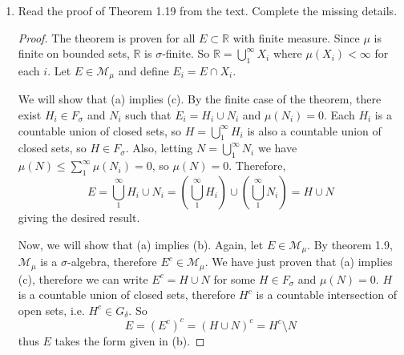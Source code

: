 \documentclass[10pt]{article}
\newcommand{\R}{\mathbb{R}}
\newcommand{\M}{\mathcal{M}}
\begin{document}
\begin{enumerate}
\begin{proof}
\end{proof}

\item Read the proof of Theorem 1.19 from the text. Complete the missing details.

\begin{proof}
The theorem is proven for all $E \subset \R$ with finite measure.  Since $\mu$ is finite on bounded sets, $\R$ is $\sigma$-finite.  So $\R = \bigcup_1^\infty X_i$ where $\mu(X_i) < \infty$ for each $i$.  Let $E \in \M_\mu$ and define $E_i = E \cap X_i$.

We will show that (a) implies (c).  By the finite case of the theorem, there exist $H_i \in F_\sigma$ and $N_i$ such that $E_i = H_i \cup N_i$ and $\mu(N_i) = 0$.  Each $H_i$ is a countable union of closed sets, so $H = \bigcup_1^\infty H_i$ is also a countable union of closed sets, so $H \in F_\sigma$.  Also, letting $N = \bigcup_1^\infty N_i$ we have $\mu(N) \leq \sum_1^\infty \mu(N_i) = 0$, so $\mu(N) = 0$.  Therefore,
$$
E = \bigcup_1^\infty H_i \cup N_i = \left(\bigcup_1^\infty H_i \right) \cup \left( \bigcup_1^\infty N_i \right) = H \cup N
$$
giving the desired result.

Now, we will show that (a) implies (b).  Again, let $E \in \M_\mu$.  By theorem 1.9, $\M_\mu$ is a $\sigma$-algebra, therefore $E^c \in \M_\mu$.  We have just proven that (a) implies (c), therefore we can write $E^c = H \cup N$ for some $H \in F_\sigma$ and $\mu(N) = 0$.  $H$ is a countable union of closed sets, therefore $H^c$ is a countable intersection of open sets, i.e. $H^c \in G_\delta$.  So
$$
E = (E^c)^c = (H \cup N)^c = H^c \setminus N
$$
thus $E$ takes the form given in (b).
\end{proof}


\end{enumerate}
\end{document}
